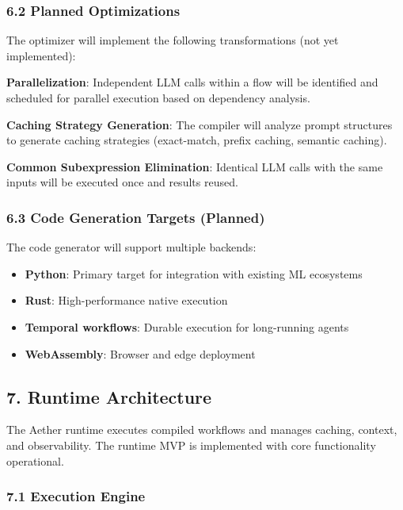 \documentclass[
]{article}
\providecommand{\tightlist}{%
  \setlength{\itemsep}{0pt}\setlength{\parskip}{0pt}}
\begin{document}
\subsubsection{6.2 Planned Optimizations}\label{planned-optimizations}

The optimizer will implement the following transformations (not yet
implemented):

\textbf{Parallelization}: Independent LLM calls within a flow will be
identified and scheduled for parallel execution based on dependency
analysis.

\textbf{Caching Strategy Generation}: The compiler will analyze prompt
structures to generate caching strategies (exact-match, prefix caching,
semantic caching).

\textbf{Common Subexpression Elimination}: Identical LLM calls with the
same inputs will be executed once and results reused.

\subsubsection{6.3 Code Generation Targets
(Planned)}\label{code-generation-targets-planned}

The code generator will support multiple backends:

\begin{itemize}
\tightlist
\item
  \textbf{Python}: Primary target for integration with existing ML
  ecosystems
\item
  \textbf{Rust}: High-performance native execution
\item
  \textbf{Temporal workflows}: Durable execution for long-running agents
\item
  \textbf{WebAssembly}: Browser and edge deployment
\end{itemize}

\subsection{7. Runtime Architecture}\label{runtime-architecture}

The Aether runtime executes compiled workflows and manages caching,
context, and observability. The runtime MVP is implemented with core
functionality operational.

\subsubsection{7.1 Execution Engine}\label{execution-engine}
\end{document}
